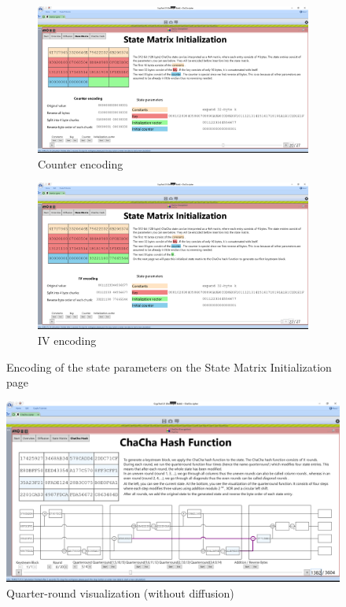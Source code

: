 \begin{figure}
\ContinuedFloat
\begin{subfigure}{\textwidth}
  \centering
  \includegraphics[width=\textwidth]{figures/ct2/state-matrix/3-state-matrix-counter.png}
  \caption{Counter encoding}
  \label{fig:statematrix.encoding.counter}
\end{subfigure}
\begin{subfigure}{\textwidth}
  \centering
  \includegraphics[width=\textwidth]{figures/ct2/state-matrix/4-state-matrix-iv.png}
  \caption{IV encoding}
  \label{fig:statematrix.encoding.iv}
\end{subfigure}
\caption[State Matrix Initialization page]{Encoding of the state parameters on the State Matrix Initialization page}
\label{fig:statematrix.encoding}
\end{figure}

\begin{figure}
  \centering
  \includegraphics[width=\textwidth]{figures/ct2/chachahash/chachahash-mid-qr.png}
  \caption{Quarter-round visualization (without diffusion)}
  \label{fig:chachahash.mid.qr.without.diffusion}
\end{figure}

